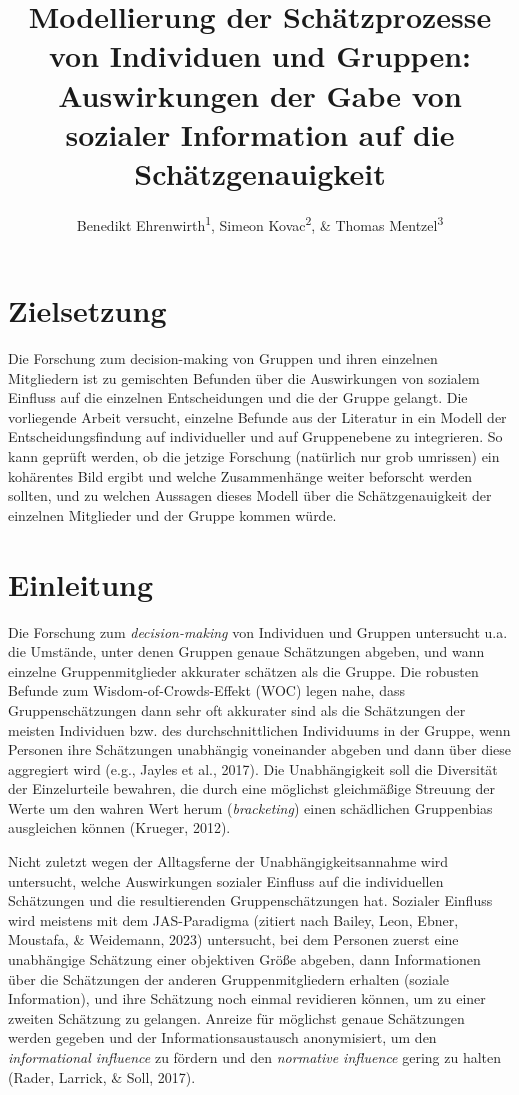 \documentclass[
  man,floatsintext]{apa6}
\title{Modellierung der Schätzprozesse von Individuen und Gruppen: Auswirkungen der Gabe von sozialer Information auf die Schätzgenauigkeit}
\author{Benedikt Ehrenwirth\textsuperscript{1}, Simeon Kovac\textsuperscript{2}, \& Thomas Mentzel\textsuperscript{3}}
\date{}
\affiliation{\vspace{0.5cm}\textsuperscript{1} Ludwig-Maximilians-Universität München (LMU)\\\textsuperscript{2} Ludwig-Maximilians-Universität München (LMU)\\\textsuperscript{3} Ludwig-Maximilians-Universität München (LMU)}
\begin{document}
\maketitle

\section{Zielsetzung}\label{zielsetzung}

Die Forschung zum decision-making von Gruppen und ihren einzelnen Mitgliedern ist zu gemischten Befunden über die Auswirkungen von sozialem Einfluss auf die einzelnen Entscheidungen und die der Gruppe gelangt. Die vorliegende Arbeit versucht, einzelne Befunde aus der Literatur in ein Modell der Entscheidungsfindung auf individueller und auf Gruppenebene zu integrieren. So kann geprüft werden, ob die jetzige Forschung (natürlich nur grob umrissen) ein kohärentes Bild ergibt und welche Zusammenhänge weiter beforscht werden sollten, und zu welchen Aussagen dieses Modell über die Schätzgenauigkeit der einzelnen Mitglieder und der Gruppe kommen würde.

\section{Einleitung}\label{einleitung}

Die Forschung zum \emph{decision-making} von Individuen und Gruppen untersucht u.a. die Umstände, unter denen Gruppen genaue Schätzungen abgeben, und wann einzelne Gruppenmitglieder akkurater schätzen als die Gruppe. Die robusten Befunde zum Wisdom-of-Crowds-Effekt (WOC) legen nahe, dass Gruppenschätzungen dann sehr oft akkurater sind als die Schätzungen der meisten Individuen bzw. des durchschnittlichen Individuums in der Gruppe, wenn Personen ihre Schätzungen unabhängig voneinander abgeben und dann über diese aggregiert wird (e.g., Jayles et al., 2017). Die Unabhängigkeit soll die Diversität der Einzelurteile bewahren, die durch eine möglichst gleichmäßige Streuung der Werte um den wahren Wert herum (\emph{bracketing}) einen schädlichen Gruppenbias ausgleichen können (Krueger, 2012).

Nicht zuletzt wegen der Alltagsferne der Unabhängigkeitsannahme wird untersucht, welche Auswirkungen sozialer Einfluss auf die individuellen Schätzungen und die resultierenden Gruppenschätzungen hat. Sozialer Einfluss wird meistens mit dem JAS-Paradigma (zitiert nach Bailey, Leon, Ebner, Moustafa, \& Weidemann, 2023) untersucht, bei dem Personen zuerst eine unabhängige Schätzung einer objektiven Größe abgeben, dann Informationen über die Schätzungen der anderen Gruppenmitgliedern erhalten (soziale Information), und ihre Schätzung noch einmal revidieren können, um zu einer zweiten Schätzung zu gelangen. Anreize für möglichst genaue Schätzungen werden gegeben und der Informationsaustausch anonymisiert, um den \emph{informational influence} zu fördern und den \emph{normative influence} gering zu halten (Rader, Larrick, \& Soll, 2017).
\end{document}
